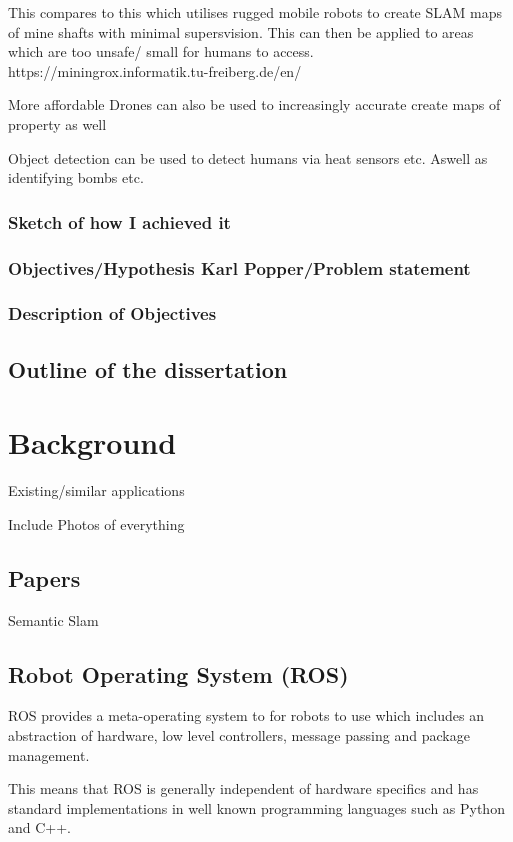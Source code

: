 \documentclass{mproj}
\begin{document}
This compares to this which utilises rugged mobile robots to create SLAM maps of mine shafts with minimal supersvision. This can then be applied to areas which are too unsafe/ small for humans to access.
https://miningrox.informatik.tu-freiberg.de/en/

More affordable Drones can also be used to increasingly accurate create maps of property as well

Object detection can be used to detect humans via heat sensors etc. Aswell as identifying bombs etc.

\subsection{Sketch of how I achieved it}

\subsection{Objectives/Hypothesis Karl Popper/Problem statement}

\subsection{Description of Objectives}

\section{Outline of the dissertation}
\chapter{Background}\label{survey}

Existing/similar applications

Include Photos of everything
\section{Papers}
Semantic Slam
\section{Robot Operating System (ROS)}

ROS provides a meta-operating system to for robots to use which includes an abstraction of hardware, low level controllers, message passing and package management.
 
This means that ROS is generally independent of hardware specifics and has standard implementations in well known programming languages such as Python and C++.
 
\end{document}
